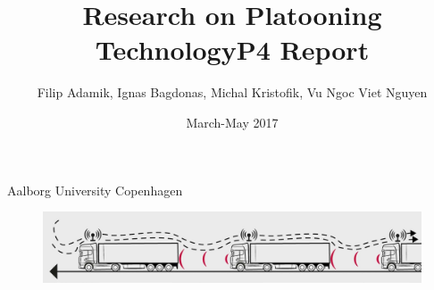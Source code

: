 \documentclass[12pt]{article}
\title{Research on Platooning Technology\newline\newline P4 Report}
\author{Filip Adamik, Ignas Bagdonas, Michal Kristofik, Vu Ngoc Viet Nguyen}
\date{March-May 2017}
\begin{document}
% 
\maketitle
% 
Aalborg University Copenhagen\par
\begin{figure}[b]
    \centering
    \includegraphics[width=.99\textwidth]{trucks-scania}
    \label{fig:trucks-scania}
\end{figure}
% 
\pagebreak
\tableofcontents


\pagebreak


\pagebreak


\pagebreak
%

\pagebreak


\pagebreak


\pagebreak


\pagebreak


\pagebreak


\pagebreak


\pagebreak


\pagebreak

\printbibliography
\end{document}
